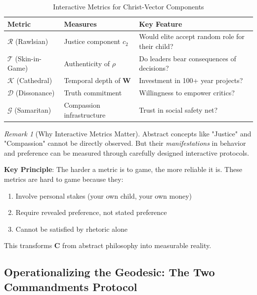 \documentclass[11pt,a4paper]{article}
\theoremstyle{definition}
\theoremstyle{remark}
\newtheorem{remark}{Remark}[section]
\begin{document}
\begin{small}
\begin{table}[H]
\centering
\caption{Interactive Metrics for Christ-Vector Components}
\label{tab:interactive_metrics}
\begin{tabular}{|p{3cm}|p{4cm}|p{6cm}|}
\hline
\textbf{Metric} & \textbf{Measures} & \textbf{Key Feature} \\
\hline
\(\mathcal{R}\) (Rawlsian) & Justice component \(c_2\) & Would elite accept random role for their child? \\
\hline
\(\mathcal{T}\) (Skin-in-Game) & Authenticity of \(\rho\) & Do leaders bear consequences of decisions? \\
\hline
\(\mathcal{K}\) (Cathedral) & Temporal depth of \(\mathbf{W}\) & Investment in 100+ year projects? \\
\hline
\(\mathcal{D}\) (Dissonance) & Truth commitment & Willingness to empower critics? \\
\hline
\(\mathcal{G}\) (Samaritan) & Compassion infrastructure & Trust in social safety net? \\
\hline
\end{tabular}
\end{table}

\begin{remark}[Why Interactive Metrics Matter]
Abstract concepts like "Justice" and "Compassion" cannot be directly observed. But their \textit{manifestations} in behavior and preference can be measured through carefully designed interactive protocols.

\textbf{Key Principle}: The harder a metric is to game, the more reliable it is. These metrics are hard to game because they:
\begin{enumerate}
    \item Involve personal stakes (your own child, your own money)
    \item Require revealed preference, not stated preference
    \item Cannot be satisfied by rhetoric alone
\end{enumerate}

This transforms \(\mathbf{C}\) from abstract philosophy into measurable reality.
\end{remark}

\subsection{Operationalizing the Geodesic: The Two Commandments Protocol}


\end{small}
\end{document}
